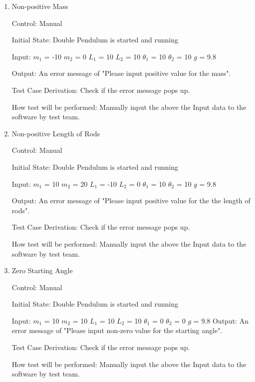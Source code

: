 \documentclass[12pt, titlepage]{article}
\begin{document}
\begin{enumerate}
					
\item{Non-positive Mass}

Control: Manual  
					
Initial State: Double Pendulum is started and running
					
Input: 
$m_1$ = -10
$m_2$ = 0
$L_1$ = 10
$L_2$	= 10			
$\theta_1$ = 10 
$\theta_2$ = 10
$g$ = 9.8

Output: An error message of "Please input positive value for the
mass". 

Test Case Derivation: Check if the error message pops up. 

How test will be performed: Manually input the above the Input data to the
software by test team. 

\item{Non-positive Length of Rods}  

Control: Manual 
          
Initial State: Double Pendulum is started and running
          
Input: 
$m_1$ = 10
$m_2$ = 20
$L_1$ = -10
$L_2$ = 0      
$\theta_1$ = 10 
$\theta_2$ = 10
$g$ = 9.8


Output: An error message of "Please input positive value for the the  length of rods".

Test Case Derivation: Check if the error message pops up. 

How test will be performed: Manually input the above the Input data to the
software by test team.
           
\item{Zero Starting Angle}  

  Control: Manual  
          
  Initial State: Double Pendulum is started and running
          
  Input: $m_1$ = 10 $m_2$ = 10 $L_1$ = 10 $L_2$ = 10 $\theta_1$ = 0 $\theta_2$ =
  0 $g$ = 9.8 Output: An error message of "Please input non-zero value for the
  starting angle".

  Test Case Derivation: Check if the error message pops up.

  How test will be performed: Manually input the above the Input data to the
  software by test team.
  
\end{enumerate}
\end{document}
